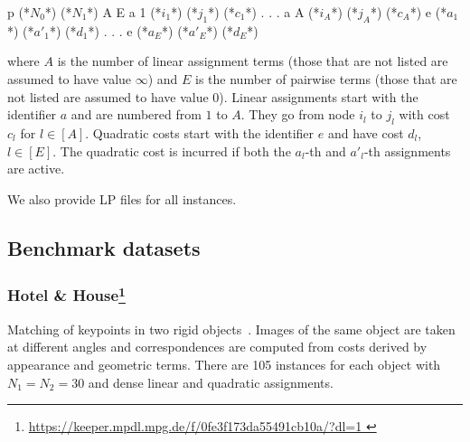 \begin{fileformat}
p (*$N_0$*) (*$N_1$*) A E 
a 1 (*$i_1$*) (*$j_1$*) (*$c_1$*)
.
.
.
a A (*$i_A$*) (*$j_A$*) (*$c_A$*)
e (*$a_1$*) (*$a'_1$*) (*$d_1$*)
.
.
.
e (*$a_E$*) (*$a'_E$*) (*$d_E$*)
\end{fileformat}
where $A$ is the number of linear assignment terms (those that are not listed are assumed to have value $\infty$) and $E$ is the number of pairwise terms (those that are not listed are assumed to have value $0$).
Linear assignments start with the identifier $a$ and are numbered from $1$ to $A$. They go from node $i_l$ to $j_l$ with cost $c_l$ for $l \in [A]$.
Quadratic costs start with the identifier $e$ and have cost $d_l$, $l \in [E]$.
The quadratic cost is incurred if both the $a_l$-th and $a'_l$-th assignments are active.

We also provide LP files for all instances.

\subsection{Benchmark datasets}

\subsubsection[Hotel \& House]{Hotel \& House\footnote{\url{https://keeper.mpdl.mpg.de/f/0fe3f173da55491cb10a/?dl=1
}}}
Matching of keypoints in two rigid objects~\cite{torresani2012dual}.
Images of the same object are taken at different angles and correspondences are computed from costs derived by appearance and geometric terms.
There are 105 instances for each object with $N_1 = N_2 = 30$ and dense linear and quadratic assignments.



